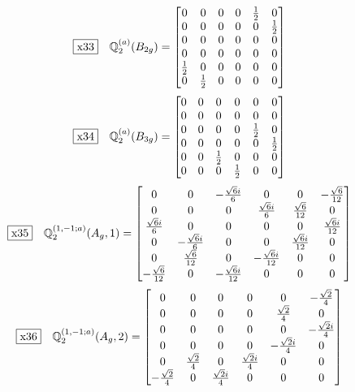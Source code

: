 \documentclass[fleqn,10pt,landscape]{jsarticle}
\begin{document}
\begin{dmath*}
\fbox{x33}\quad \mathbb{Q}_{2}^{(a)}(B_{2g})=\begin{bmatrix} 0 & 0 & 0 & 0 & \frac{1}{2} & 0 \\ 0 & 0 & 0 & 0 & 0 & \frac{1}{2} \\ 0 & 0 & 0 & 0 & 0 & 0 \\ 0 & 0 & 0 & 0 & 0 & 0 \\ \frac{1}{2} & 0 & 0 & 0 & 0 & 0 \\ 0 & \frac{1}{2} & 0 & 0 & 0 & 0 \end{bmatrix}
\end{dmath*}
\begin{dmath*}
\fbox{x34}\quad \mathbb{Q}_{2}^{(a)}(B_{3g})=\begin{bmatrix} 0 & 0 & 0 & 0 & 0 & 0 \\ 0 & 0 & 0 & 0 & 0 & 0 \\ 0 & 0 & 0 & 0 & \frac{1}{2} & 0 \\ 0 & 0 & 0 & 0 & 0 & \frac{1}{2} \\ 0 & 0 & \frac{1}{2} & 0 & 0 & 0 \\ 0 & 0 & 0 & \frac{1}{2} & 0 & 0 \end{bmatrix}
\end{dmath*}
\begin{dmath*}
\fbox{x35}\quad \mathbb{Q}_{2}^{(1,-1;a)}(A_{g},1)=\begin{bmatrix} 0 & 0 & - \frac{\sqrt{6} i}{6} & 0 & 0 & - \frac{\sqrt{6}}{12} \\ 0 & 0 & 0 & \frac{\sqrt{6} i}{6} & \frac{\sqrt{6}}{12} & 0 \\ \frac{\sqrt{6} i}{6} & 0 & 0 & 0 & 0 & \frac{\sqrt{6} i}{12} \\ 0 & - \frac{\sqrt{6} i}{6} & 0 & 0 & \frac{\sqrt{6} i}{12} & 0 \\ 0 & \frac{\sqrt{6}}{12} & 0 & - \frac{\sqrt{6} i}{12} & 0 & 0 \\ - \frac{\sqrt{6}}{12} & 0 & - \frac{\sqrt{6} i}{12} & 0 & 0 & 0 \end{bmatrix}
\end{dmath*}
\begin{dmath*}
\fbox{x36}\quad \mathbb{Q}_{2}^{(1,-1;a)}(A_{g},2)=\begin{bmatrix} 0 & 0 & 0 & 0 & 0 & - \frac{\sqrt{2}}{4} \\ 0 & 0 & 0 & 0 & \frac{\sqrt{2}}{4} & 0 \\ 0 & 0 & 0 & 0 & 0 & - \frac{\sqrt{2} i}{4} \\ 0 & 0 & 0 & 0 & - \frac{\sqrt{2} i}{4} & 0 \\ 0 & \frac{\sqrt{2}}{4} & 0 & \frac{\sqrt{2} i}{4} & 0 & 0 \\ - \frac{\sqrt{2}}{4} & 0 & \frac{\sqrt{2} i}{4} & 0 & 0 & 0 \end{bmatrix}
\end{dmath*}
\end{document}
